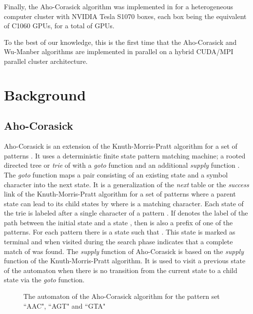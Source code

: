 \documentclass{ws-ijait}
\begin{document}
Finally, the Aho-Corasick algorithm was implemented in \cite{Tumeo2012} for a heterogeneous computer cluster with  NVIDIA Tesla S1070 boxes, each box being the equivalent of  C1060 GPUs, for a total of  GPUs.

To the best of our knowledge, this is the first time that the Aho-Corasick and Wu-Manber algorithms are implemented in parallel on a hybrid CUDA/MPI parallel cluster architecture.

\section{Background}
\label{sec:background}

\subsection{Aho-Corasick}

Aho-Corasick is an extension of the Knuth-Morris-Pratt algorithm for a set of patterns . It uses a deterministic finite state pattern matching machine; a rooted directed tree or \textit{trie} of  with a \textit{goto} function  and an additional \textit{supply} function . The \textit{goto} function maps a pair consisting of an existing state  and a symbol character into the next state. It is a generalization of the \textit{next} table or the \textit{success} link of the Knuth-Morris-Pratt algorithm for a set of patterns where a parent state can lead to its child states by  where  is a matching character. Each state of the trie is labeled after a single character of a pattern . If  denotes the label of the path between the initial state and a state , then  is also a prefix of one of the patterns. For each pattern  there is a state  such that . This state is marked as terminal and when visited during the search phase indicates that a complete match of  was found. The \textit{supply} function of Aho-Corasick is based on the \textit{supply} function of the Knuth-Morris-Pratt algorithm. It is used to visit a previous state of the automaton when there is no transition from the current state to a child state via the \textit{goto} function.

\begin{figure}[h]
\centering
{}
  \caption[The automaton of the Aho-Corasick algorithm]{The automaton of the Aho-Corasick algorithm for the pattern set ``AAC", ``AGT" and ``GTA" }
  \label{fig:ACtransitiondiagram}
\end{figure}
\end{document}
